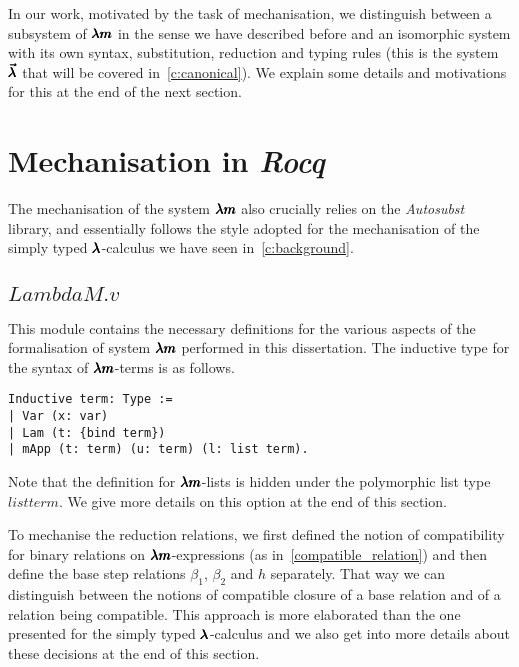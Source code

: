 In our work, motivated by the task of mechanisation, we distinguish between a subsystem of $\pmb{\lambda m}$ in the sense we have described before and an isomorphic system with its own syntax, substitution, reduction and typing rules (this is the system~$\pmb{\vec \lambda}$ that will be covered in~\cref{c:canonical}).
We explain some details and motivations for this at the end of the next section.


\section{Mechanisation in \textit{Rocq}}

The mechanisation of the system $\pmb{\lambda m}$ also crucially relies on the \textit{Autosubst} library, and essentially follows the style adopted for the mechanisation of the simply typed $\pmb{\lambda}$-calculus we have seen in~\cref{c:background}.

\subsection{\lst$LambdaM.v$}

This module contains the necessary definitions for the various aspects of the formalisation of system $\pmb{\lambda m}$ performed in this dissertation.
The inductive type for the syntax of $\pmb{\lambda m}$-terms is as follows.
\begin{lstlisting}[language=Coq]
Inductive term: Type :=
| Var (x: var)
| Lam (t: {bind term})
| mApp (t: term) (u: term) (l: list term).
\end{lstlisting}
Note that the definition for $\pmb{\lambda m}$-lists is hidden under the polymorphic list type \lst$list term$.
We give more details on this option at the end of this section.

To mechanise the reduction relations, we first defined the notion of compatibility for binary relations on $\pmb{\lambda m}$-expressions (as in~\cref{compatible_relation}) and then define the base step relations $\beta_1$, $\beta_2$ and $h$ separately.
That way we can distinguish between the notions of compatible closure of a base relation and of a relation being compatible.
This approach is more elaborated than the one presented for the simply typed $\pmb{\lambda}$-calculus and we also get into more details about these decisions at the end of this section.

